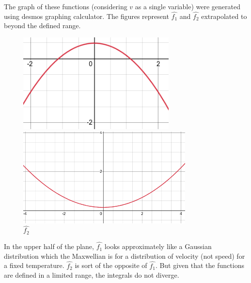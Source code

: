 \documentclass[12pt]{article}
\begin{document}
{	\noindent The graph of these functions (considering $v$ as a single variable) were generated using desmos graphing calculator. The figures represent $\hat{f_{1}}$ and $\hat{f_{2}}$ extrapolated to beyond the defined range.
	\begin{figure}[H]
		\begin{multicols}{2}
			\includegraphics[width=\linewidth, height=5cm]{first.png} \caption{$\hat{f_{1}}$} \par
			\includegraphics[width=\linewidth, height=5cm]{second.png} \caption{$\hat{f_{2}}$} \par
		\end{multicols}
	\end{figure}

	\noindent In the upper half of the plane, $\hat{f_{1}}$ looks approximately like a Gaussian distribution which the Maxwellian is for a distribution of velocity (not speed) for a fixed temperature. $\hat{f_{2}}$ is sort of the opposite of $\hat{f_{1}}$. But given that the functions are defined in a limited range, the integrals do not diverge.
	
}
\end{document}
